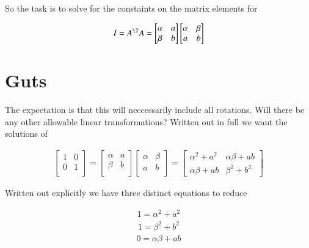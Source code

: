 So the task is to solve for the constaints on the matrix elements for

\begin{align}\label{eqn:hamiltonian:voo4}
I = A^\T A = 
\begin{bmatrix}
\alpha & a     \\
\beta  & b \\
\end{bmatrix}
\begin{bmatrix}
\alpha & \beta \\
a      & b \\
\end{bmatrix}
\end{align}

\section{Guts}

The expectation is that this will neccessarily include all rotations.  Will there be any other allowable linear transformations?  Written out in full we want the solutions of 

\begin{align}\label{eqn:hamiltonian:voo5a}
\begin{bmatrix}
1 & 0 \\
0 & 1 \\
\end{bmatrix}
=
\begin{bmatrix}
\alpha & a     \\
\beta  & b \\
\end{bmatrix}
\begin{bmatrix}
\alpha & \beta \\
a      & b \\
\end{bmatrix}
= 
\begin{bmatrix}
\alpha^2 + a^2 & \alpha \beta + a b \\
\alpha \beta + a b & \beta^2 + b^2
\end{bmatrix}
\end{align}

Written out explicitly we have three distinct equations to reduce

\begin{align}\label{eqn:hamiltonian:voo5}
1 = \alpha^2 + a^2 
\end{align}
\begin{align}\label{eqn:hamiltonian:voo6}
1 = \beta^2 + b^2 
\end{align}
\begin{align}\label{eqn:hamiltonian:voo7}
0 = \alpha \beta + a b 
\end{align}


